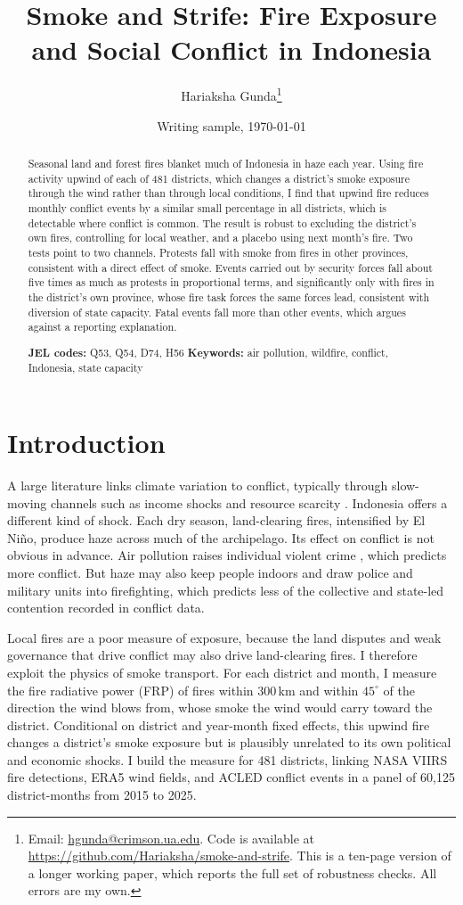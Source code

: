 \documentclass[12pt]{article}
\title{Smoke and Strife: Fire Exposure and Social Conflict in Indonesia}
\author{Hariaksha Gunda\thanks{Email: \href{mailto:hgunda@crimson.ua.edu}{hgunda@crimson.ua.edu}. Code is available at \url{https://github.com/Hariaksha/smoke-and-strife}. This is a ten-page version of a longer working paper, which reports the full set of robustness checks. All errors are my own.}}
\affil{The University of Alabama}
\date{Writing sample, \today}
\begin{document}
\maketitle

\begin{abstract}
\noindent Seasonal land and forest fires blanket much of Indonesia in haze each year. Using fire activity upwind of each of 481 districts, which changes a district's smoke exposure through the wind rather than through local conditions, I find that upwind fire reduces monthly conflict events by a similar small percentage in all districts, which is detectable where conflict is common. The result is robust to excluding the district's own fires, controlling for local weather, and a placebo using next month's fire. Two tests point to two channels. Protests fall with smoke from fires in other provinces, consistent with a direct effect of smoke. Events carried out by security forces fall about five times as much as protests in proportional terms, and significantly only with fires in the district's own province, whose fire task forces the same forces lead, consistent with diversion of state capacity. Fatal events fall more than other events, which argues against a reporting explanation.

\medskip
\noindent\textbf{JEL codes:} Q53, Q54, D74, H56 \quad \textbf{Keywords:} air pollution, wildfire, conflict, Indonesia, state capacity
\end{abstract}

\section{Introduction}

A large literature links climate variation to conflict, typically through slow-moving channels such as income shocks and resource scarcity \citep{hsiang2013quantifying, burkehsiangmiguel2015}. Indonesia offers a different kind of shock. Each dry season, land-clearing fires, intensified by El Ni\~{n}o, produce haze across much of the archipelago. Its effect on conflict is not obvious in advance. Air pollution raises individual violent crime \citep{herrnstadt2021, burkhardt2019}, which predicts more conflict. But haze may also keep people indoors and draw police and military units into firefighting, which predicts less of the collective and state-led contention recorded in conflict data.

Local fires are a poor measure of exposure, because the land disputes and weak governance that drive conflict may also drive land-clearing fires. I therefore exploit the physics of smoke transport. For each district and month, I measure the fire radiative power (FRP) of fires within 300\,km and within $45^{\circ}$ of the direction the wind blows from, whose smoke the wind would carry toward the district. Conditional on district and year-month fixed effects, this upwind fire changes a district's smoke exposure but is plausibly unrelated to its own political and economic shocks. I build the measure for 481 districts, linking NASA VIIRS fire detections, ERA5 wind fields, and ACLED conflict events in a panel of 60,125 district-months from 2015 to 2025.
\end{document}
